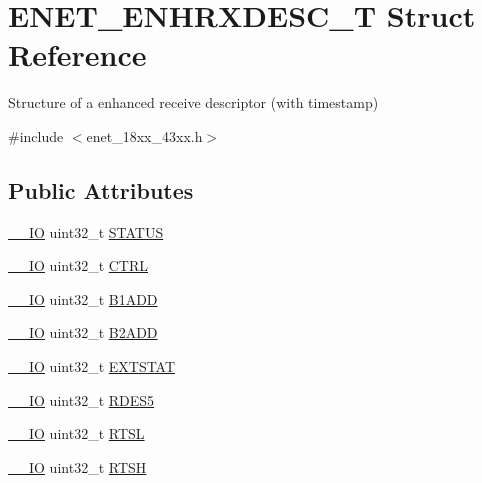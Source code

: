 \hypertarget{struct_e_n_e_t___e_n_h_r_x_d_e_s_c___t}{}\section{E\+N\+E\+T\+\_\+\+E\+N\+H\+R\+X\+D\+E\+S\+C\+\_\+T Struct Reference}
\label{struct_e_n_e_t___e_n_h_r_x_d_e_s_c___t}


Structure of a enhanced receive descriptor (with timestamp)  




{\ttfamily \#include $<$enet\+\_\+18xx\+\_\+43xx.\+h$>$}

\subsection*{Public Attributes}
\begin{DoxyCompactItemize}
\item 
\hyperlink{core__sc300_8h_aec43007d9998a0a0e01faede4133d6be}{\+\_\+\+\_\+\+IO} uint32\+\_\+t \hyperlink{struct_e_n_e_t___e_n_h_r_x_d_e_s_c___t_a9f7ff354fc8c16564c13eb5674fc0725}{S\+T\+A\+T\+US}
\item 
\hyperlink{core__sc300_8h_aec43007d9998a0a0e01faede4133d6be}{\+\_\+\+\_\+\+IO} uint32\+\_\+t \hyperlink{struct_e_n_e_t___e_n_h_r_x_d_e_s_c___t_abaaf72127d9945e976c5381aeeddb426}{C\+T\+RL}
\item 
\hyperlink{core__sc300_8h_aec43007d9998a0a0e01faede4133d6be}{\+\_\+\+\_\+\+IO} uint32\+\_\+t \hyperlink{struct_e_n_e_t___e_n_h_r_x_d_e_s_c___t_afc652bb16c0e010ce7fff8a82ccff998}{B1\+A\+DD}
\item 
\hyperlink{core__sc300_8h_aec43007d9998a0a0e01faede4133d6be}{\+\_\+\+\_\+\+IO} uint32\+\_\+t \hyperlink{struct_e_n_e_t___e_n_h_r_x_d_e_s_c___t_ad81ba09740498609241b01fcbdd854fe}{B2\+A\+DD}
\item 
\hyperlink{core__sc300_8h_aec43007d9998a0a0e01faede4133d6be}{\+\_\+\+\_\+\+IO} uint32\+\_\+t \hyperlink{struct_e_n_e_t___e_n_h_r_x_d_e_s_c___t_ab2035bc2dae2595a849b1223a476fc14}{E\+X\+T\+S\+T\+AT}
\item 
\hyperlink{core__sc300_8h_aec43007d9998a0a0e01faede4133d6be}{\+\_\+\+\_\+\+IO} uint32\+\_\+t \hyperlink{struct_e_n_e_t___e_n_h_r_x_d_e_s_c___t_ad5fcb75925a4aac1c2500b84ea76a8eb}{R\+D\+E\+S5}
\item 
\hyperlink{core__sc300_8h_aec43007d9998a0a0e01faede4133d6be}{\+\_\+\+\_\+\+IO} uint32\+\_\+t \hyperlink{struct_e_n_e_t___e_n_h_r_x_d_e_s_c___t_a646c7825a53c70e1ee3e09e2f74cdec8}{R\+T\+SL}
\item 
\hyperlink{core__sc300_8h_aec43007d9998a0a0e01faede4133d6be}{\+\_\+\+\_\+\+IO} uint32\+\_\+t \hyperlink{struct_e_n_e_t___e_n_h_r_x_d_e_s_c___t_a65b235c82d60b315c1737d45ee7fd476}{R\+T\+SH}
\end{DoxyCompactItemize}



